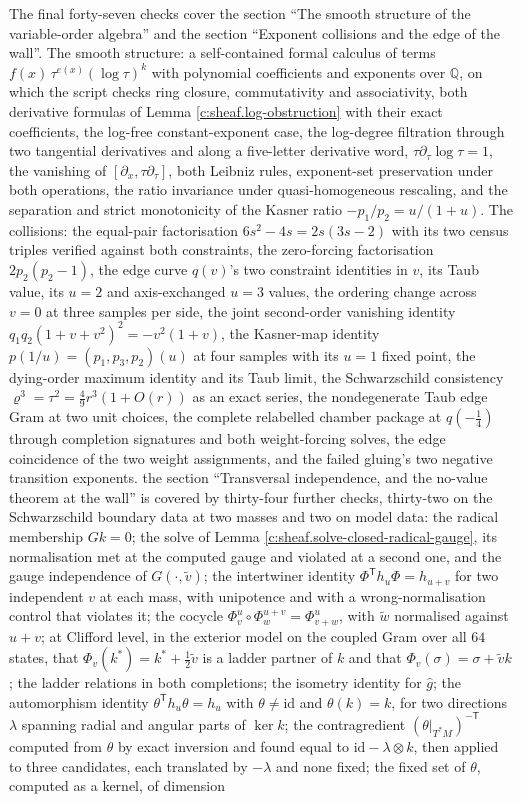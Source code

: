 \documentclass[11pt]{article}
\theoremstyle{definition}
\theoremstyle{plain}
\providecommand{\id}{}\renewcommand{\id}{\mathrm{id}}
\begin{document}
The final forty-seven checks cover the section ``The smooth structure of the variable-order algebra'' and the section ``Exponent collisions and the edge of the wall''. The smooth structure: a self-contained formal calculus of terms $f(x)\,\tau^{e(x)}(\log\tau)^k$ with polynomial coefficients and exponents over $\mathbb{Q}$, on which the script checks ring closure, commutativity and associativity, both derivative formulas of Lemma \ref{c:sheaf.log-obstruction} with their exact coefficients, the log-free constant-exponent case, the log-degree filtration through two tangential derivatives and along a five-letter derivative word, $\tau\partial_\tau\log\tau = 1$, the vanishing of $[\partial_x, \tau\partial_\tau]$, both Leibniz rules, exponent-set preservation under both operations, the ratio invariance under quasi-homogeneous rescaling, and the separation and strict monotonicity of the Kasner ratio $-p_1/p_2 = u/(1+u)$. The collisions: the equal-pair factorisation $6s^2-4s = 2s(3s-2)$ with its two census triples verified against both constraints, the zero-forcing factorisation $2p_2(p_2-1)$, the edge curve $q(v)$'s two constraint identities in $v$, its Taub value, its $u=2$ and axis-exchanged $u=3$ values, the ordering change across $v=0$ at three samples per side, the joint second-order vanishing identity $q_1q_2(1+v+v^2)^2 = -v^2(1+v)$, the Kasner-map identity $p(1/u) = (p_1,p_3,p_2)(u)$ at four samples with its $u=1$ fixed point, the dying-order maximum identity and its Taub limit, the Schwarzschild consistency $\varrho^3 = \tau^2 = \tfrac49 r^3(1+O(r))$ as an exact series, the nondegenerate Taub edge Gram at two unit choices, the complete relabelled chamber package at $q(-\tfrac14)$ through completion signatures and both weight-forcing solves, the edge coincidence of the two weight assignments, and the failed gluing's two negative transition exponents. the section ``Transversal independence, and the no-value theorem at the wall'' is covered by thirty-four further checks, thirty-two on the Schwarzschild boundary data at two masses and two on model data: the radical membership $Gk = 0$; the solve of Lemma \ref{c:sheaf.solve-closed-radical-gauge}, its normalisation met at the computed gauge and violated at a second one, and the gauge independence of $G(\cdot, \tilde v)$; the intertwiner identity $\Phi^{\mathsf{T}} h_u \Phi = h_{u+v}$ for two independent $v$ at each mass, with unipotence and with a wrong-normalisation control that violates it; the cocycle $\Phi^u_v \circ \Phi^{u+v}_w = \Phi^u_{v+w}$, with $\tilde w$ normalised against $u + v$; at Clifford level, in the exterior model on the coupled Gram over all $64$ states, that $\Phi_v(k^*) = k^* + \tfrac12\tilde v$ is a ladder partner of $k$ and that $\Phi_v(\sigma) = \sigma + \tilde v k$; the ladder relations in both completions; the isometry identity for $\hat g$; the automorphism identity $\theta^{\mathsf{T}} h_u \theta = h_u$ with $\theta \neq \id$ and $\theta(k) = k$, for two directions $\lambda$ spanning radial and angular parts of $\ker k$; the contragredient $(\theta|_{T^*M})^{-\mathsf{T}}$ computed from $\theta$ by exact inversion and found equal to $\id - \lambda \otimes k$, then applied to three candidates, each translated by $-\lambda$ and none fixed; the fixed set of $\theta$, computed as a kernel, of dimension 
\end{document}
